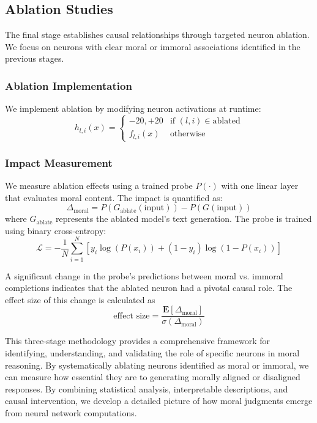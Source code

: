 \documentclass[runninghheads]{llncs}
\begin{document}
\subsection{Ablation Studies}
The final stage establishes causal relationships through targeted neuron ablation. We focus on neurons with clear moral or immoral associations identified in the previous stages.

\subsubsection{Ablation Implementation}
We implement ablation by modifying neuron activations at runtime:
$$
h_{l,i}(x) = \begin{cases} -20, +20 & \text{if } (l,i) \in \text{ablated} \\ f_{l,i}(x) & \text{otherwise} \end{cases}
$$

\subsubsection{Impact Measurement}
We measure ablation effects using a trained probe $P(\cdot)$ with one linear layer that evaluates moral content. The impact is quantified as:
$$
\Delta_{\text{moral}} = P(G_{\text{ablate}}(\text{input})) - P(G(\text{input}))
$$
where $G_{\text{ablate}}$ represents the ablated model's text generation. The probe is trained using binary cross-entropy:
$$
\mathcal{L} = -\frac{1}{N}\sum_{i=1}^N [y_i \log(P(x_i)) + (1-y_i)\log(1-P(x_i))]
$$

A significant change in the probe's predictions between moral vs. immoral completions indicates that the ablated neuron had a pivotal causal role. The effect size of this change is calculated as
$$
\text{effect size} = \frac{\mathbf{E}[\Delta_{\text{moral}}]}{\sigma(\Delta_{\text{moral}})}
$$

This three-stage methodology provides a comprehensive framework for identifying, understanding, and validating the role of specific neurons in moral reasoning. 
By systematically ablating neurons identified as moral or immoral, we can measure how essential they are to generating morally aligned or disaligned responses.
By combining statistical analysis, interpretable descriptions, and causal intervention, we develop a detailed picture of how moral judgments emerge from neural network computations.
\end{document}

